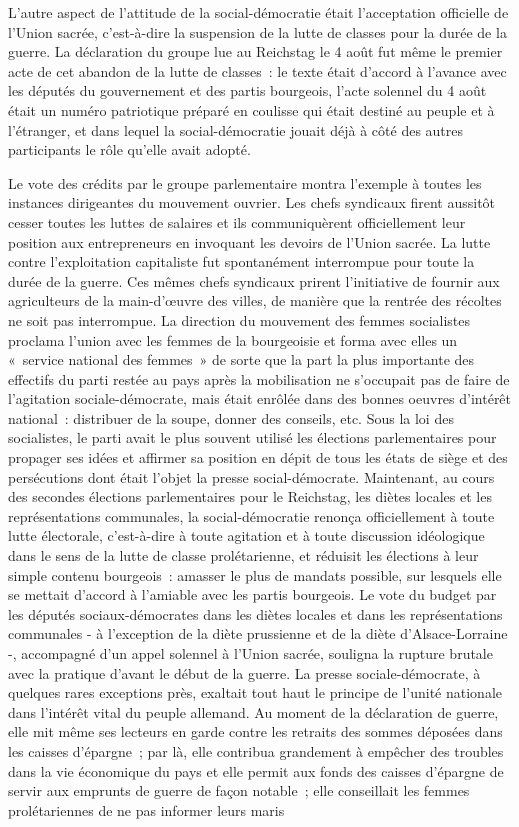 \documentclass[french,twoside]{book} %
\begin{document}
\noindent L'autre aspect de l’attitude de la social-démocratie était l’acceptation officielle de l’Union sacrée, c’est-à-dire la suspension de la lutte de classes pour la durée de la guerre. La déclaration du groupe lue au Reichstag le 4 août fut même le premier acte de cet abandon de la lutte de classes : le texte était d’accord à l’avance avec les députés du gouvernement et des partis bourgeois, l’acte solennel du 4 août était un numéro patriotique préparé en coulisse qui était destiné au peuple et à l’étranger, et dans lequel la social-démocratie jouait déjà à côté des autres participants le rôle qu’elle avait adopté.\par
Le vote des crédits par le groupe parlementaire montra l’exemple à toutes les instances dirigeantes du mouvement ouvrier. Les chefs syndicaux firent aussitôt cesser toutes les luttes de salaires et ils communiquèrent officiellement leur position aux entrepreneurs en invoquant les devoirs de l’Union sacrée. La lutte contre l’exploitation capitaliste fut spontanément interrompue pour toute la durée de la guerre. Ces mêmes chefs syndicaux prirent l’initiative de fournir aux agriculteurs de la main-d’œuvre des villes, de manière que la rentrée des récoltes ne soit pas interrompue. La direction du mouvement des femmes socialistes proclama l’union avec les femmes de la bourgeoisie et forma avec elles un « service national des  femmes » de sorte que la part la plus importante des effectifs du parti restée au pays après la mobilisation ne s’occupait pas de faire de l’agitation sociale-démocrate, mais était enrôlée dans des bonnes oeuvres d’intérêt national : distribuer de la soupe, donner des conseils, etc. Sous la loi des socialistes, le parti avait le plus souvent utilisé les élections parlementaires pour propager ses idées et affirmer sa position en dépit de tous les états de siège et des persécutions dont était l’objet la presse social-démocrate. Maintenant, au cours des secondes élections parlementaires pour le Reichstag, les diètes locales et les représentations communales, la social-démocratie renonça officiellement à toute lutte électorale, c’est-à-dire à toute agitation et à toute discussion idéologique dans le sens de la lutte de classe prolétarienne, et réduisit les élections à leur simple contenu bourgeois : amasser le plus de mandats possible, sur lesquels elle se mettait d’accord à l’amiable avec les partis bourgeois. Le vote du budget par les députés sociaux-démocrates dans les diètes locales et dans les représentations communales - à l’exception de la diète prussienne et de la diète d’Alsace-Lorraine -, accompagné d’un appel solennel à l’Union sacrée, souligna la rupture brutale avec la pratique d’avant le début de la guerre. La presse sociale-démocrate, à quelques rares exceptions près, exaltait tout haut le principe de l’unité nationale dans l’intérêt vital du peuple allemand. Au moment de la déclaration de guerre, elle mit même ses lecteurs en garde contre les retraits des sommes déposées dans les caisses d’épargne ; par là, elle contribua grandement à empêcher des troubles dans la vie économique du pays et elle permit aux fonds des caisses d’épargne de servir aux emprunts de guerre de façon notable ; elle conseillait les femmes prolétariennes de ne pas informer leurs maris 
\end{document}
